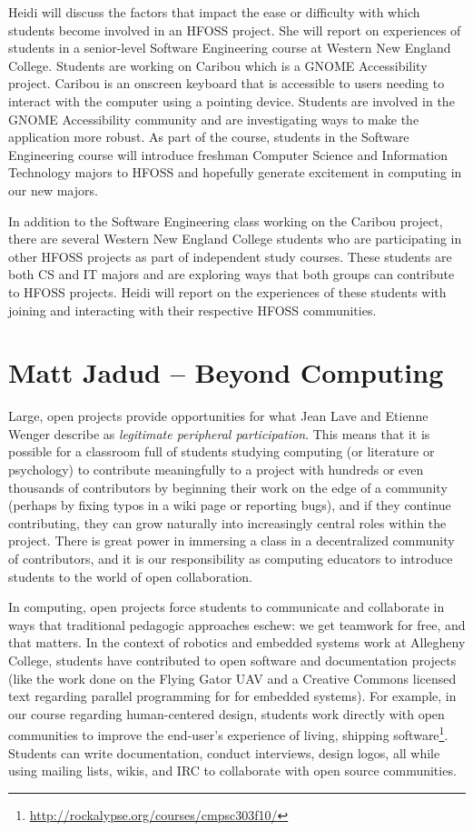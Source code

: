 \documentclass{sig-alt-release2}
\begin{document}
Heidi will discuss the factors that impact the ease or difficulty with which students become involved in an HFOSS project. She will report on experiences of students in a senior-level Software Engineering course at Western New England College. Students are working on Caribou which is a GNOME Accessibility project. Caribou is an onscreen keyboard that is accessible to users needing to interact with the computer using a pointing device. Students are involved in the GNOME Accessibility community and are investigating ways to make the application more robust. As part of the course, students in the Software Engineering course will introduce freshman Computer Science and Information Technology majors to HFOSS and hopefully generate excitement in computing in our new majors.

In addition to the Software Engineering class working on the Caribou project, there are several Western New England College students who are participating in other HFOSS projects as part of independent study courses. These students are both CS and IT majors and are exploring ways that both groups can contribute to HFOSS projects. Heidi will report on the experiences of these students with joining and interacting with their respective HFOSS communities.  

\newpage

\section{Matt Jadud -- Beyond Computing}

Large, open projects provide opportunities for what Jean Lave and Etienne Wenger describe as {\em legitimate peripheral participation}. This means that it is possible for a classroom full of students studying computing (or literature or psychology) to contribute meaningfully to a project with hundreds or even thousands of contributors by beginning their work on the edge of a community (perhaps by fixing typos in a wiki page or reporting bugs), and if they continue contributing, they can grow naturally into increasingly central roles within the project. There is great power in immersing a class in a decentralized community of contributors, and it is our responsibility as computing educators to introduce students to the world of open collaboration.

In computing, open projects force students to communicate and collaborate in ways that traditional pedagogic approaches eschew: we get teamwork for free, and that matters. In the context of robotics and embedded systems work at Allegheny College, students have contributed to open software and documentation projects (like the work done on the Flying Gator UAV and a Creative Commons licensed text regarding parallel programming for for embedded systems). For example, in our course regarding human-centered design, students work directly with open communities to improve the end-user's experience of living, shipping software\footnote{\url{http://rockalypse.org/courses/cmpsc303f10/}}. Students can write documentation, conduct interviews, design logos, all while using mailing lists, wikis, and IRC to collaborate with open source communities. 
\end{document}
